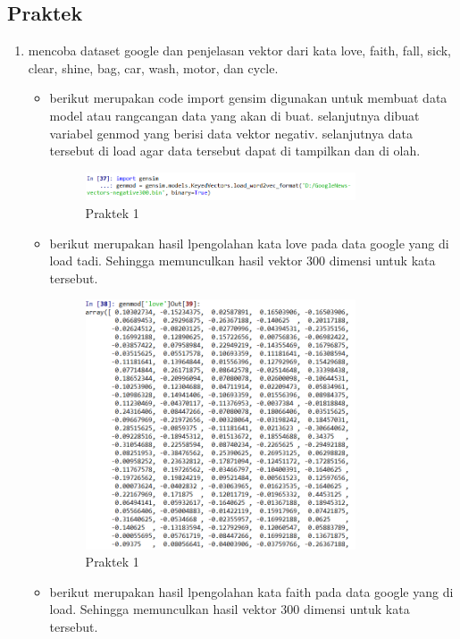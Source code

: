 \subsection{Praktek}
\begin{enumerate}


\item  mencoba dataset google dan penjelasan vektor dari kata love, faith, fall, sick, clear, shine, bag, car, wash, motor, dan cycle.
	\hfill\\
\begin{itemize}
\item berikut merupakan code import gensim digunakan untuk membuat data model atau rangcangan data yang akan di buat. selanjutnya dibuat variabel genmod yang berisi data vektor negativ. selanjutnya data tersebut di load agar data tersebut dapat di tampilkan dan di olah.	
	
\begin{figure}[H]
    \includegraphics[width=8cm]{figures/1174084/5/1.png}
    \centering
    \caption{Praktek 1}
\end{figure}

\item berikut merupakan hasil lpengolahan kata love pada data google yang di load tadi. Sehingga memunculkan hasil vektor 300 dimensi untuk kata tersebut.

\begin{figure}[H]
    \includegraphics[width=8cm]{figures/1174084/5/2.png}
    \centering
    \caption{Praktek 1}
\end{figure}

\item berikut merupakan hasil lpengolahan kata faith pada data google yang di load. Sehingga memunculkan hasil vektor 300 dimensi untuk kata tersebut.


\end{itemize}
\end{enumerate}
